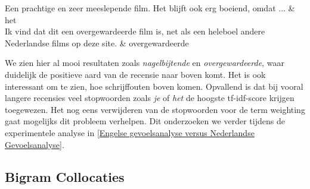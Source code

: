 \begin{table}[h]
\begin{tabu}
Een prachtige en zeer meeslepende film. Het blijft ook erg boeiend, omdat ... & het                                  \\ \hline
Ik vind dat dit een overgewardeerde film is, net als een heleboel andere Nederlandse films op deze site.                                                                                                                                                                                                                                                                                                                                                                                                                                                                                                                                                                                                                                                                                                                                                                                                                                                                                                                                                                                                                                                                                                                                                                                                                                                                                                                                                                                        & overgewardeerde                      \\ \hline
\end{tabu}
\caption{Enkele recensies met het woord met de hoogste tf-idf score}
\label{examples recensies}
\end{table}


We zien hier al mooi resultaten zoals \textit{nagelbijtende} en \textit{overgewardeerde}, waar duidelijk de positieve aard van de recensie naar boven komt. Het is ook interessant om te zien, hoe schrijffouten boven komen. Opvallend is dat bij vooral langere recensies veel stopwoorden zoals \textit{je} of \textit{het} de hoogste tf-idf-score krijgen toegewezen. Het nog eens verwijderen van de stopwoorden voor de term weighting gaat mogelijks dit probleem verhelpen. Dit onderzoeken we verder tijdens de experimentele analyse in \ref{Engelse gevoelsanalyse versus Nederlandse Gevoelsanalyse}. 


\subsection{Bigram Collocaties}\label{Bigram Collocaties}

